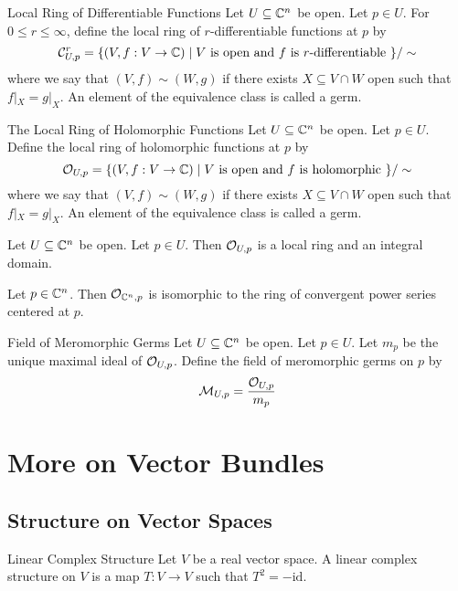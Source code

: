 \documentclass[a4paper]{article}
\begin{document}
\begin{defn}{Local Ring of Differentiable Functions}{} Let $U\subseteq\mathbb{C}^n$ be open. Let $p\in U$. For $0\leq r\leq\infty$, define the local ring of $r$-differentiable functions at $p$ by $$\mathcal{C}_{U,p}^r=\{(V,f:V\to\mathbb{C})\;|\;V\text{ is open and }f\text{ is }r\text{-differentiable }\}/\sim$$ where we say that $(V,f)\sim(W,g)$ if there exists $X\subseteq V\cap W$ open such that $f|_X=g|_X$. An element of the equivalence class is called a germ. 
\end{defn}

\begin{defn}{The Local Ring of Holomorphic Functions}{} Let $U\subseteq\mathbb{C}^n$ be open. Let $p\in U$. Define the local ring of holomorphic functions at $p$ by $$\mathcal{O}_{U,p}=\{(V,f:V\to\mathbb{C})\;|\;V\text{ is open and }f\text{ is holomorphic }\}/\sim$$ where we say that $(V,f)\sim(W,g)$ if there exists $X\subseteq V\cap W$ open such that $f|_X=g|_X$. An element of the equivalence class is called a germ. 
\end{defn}

\begin{prp}{}{} Let $U\subseteq\mathbb{C}^n$ be open. Let $p\in U$. Then $\mathcal{O}_{U,p}$ is a local ring and an integral domain. 
\end{prp}

\begin{prp}{}{} Let $p\in\mathbb{C}^n$. Then $\mathcal{O}_{\mathbb{C}^n,p}$ is isomorphic to the ring of convergent power series centered at $p$. 
\end{prp}

\begin{defn}{Field of Meromorphic Germs}{} Let $U\subseteq\mathbb{C}^n$ be open. Let $p\in U$. Let $m_p$ be the unique maximal ideal of $\mathcal{O}_{U,p}$. Define the field of meromorphic germs on $p$ by $$\mathcal{M}_{U,p}=\frac{\mathcal{O}_{U,p}}{m_p}$$
\end{defn}

\pagebreak
\section{More on Vector Bundles}
\subsection{Structure on Vector Spaces}
\begin{defn}{Linear Complex Structure}{} Let $V$ be a real vector space. A linear complex structure on $V$ is a map $T:V\to V$ such that $T^2=-\text{id}$. 
\end{defn}
\end{document}
